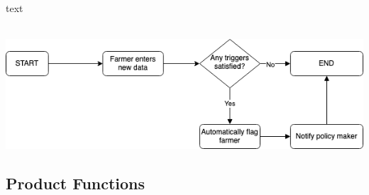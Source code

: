 text \\
\medskip
\\

\begin{center}
\includegraphics[scale=0.4]{../images_diagrams/newfarmerdata_trigger.png}
\end{center}



\subsection{Product Functions}
